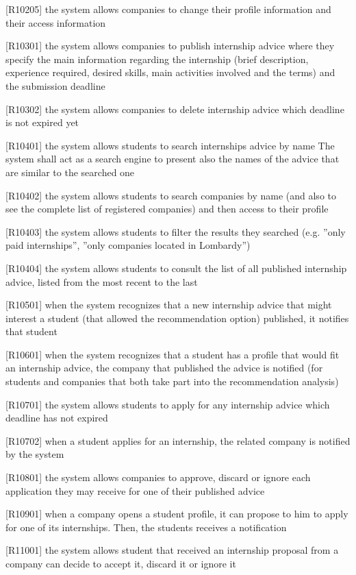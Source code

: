 		[R10205] the system allows companies to change their profile information and their access information
		
		[R10301] the system allows companies to publish internship advice where they specify the main information regarding the internship (brief description, experience required, desired skills, main activities involved and the terms) and the submission deadline
		
		[R10302] the system allows companies to delete internship advice which deadline is not expired yet
		
		[R10401] the system allows students to search internships advice by name The system shall act as a search engine to present also the names of the advice that are similar to the searched one
		
		[R10402] the system allows students to search companies by name (and also to see the complete list of registered companies) and then access to their profile
		
		[R10403] the system allows students to filter the results they searched (e.g. ”only paid internships”, ”only companies located in Lombardy”)
		
		[R10404] the system allows students to consult the list of all published internship advice, listed from the most recent to the last
		
		[R10501] when the system recognizes that a new internship advice that might interest a student (that allowed the recommendation option) published, it notifies that student
		
		[R10601] when the system recognizes that a student has a profile that would fit an internship advice, the company that published the advice is notified (for students and companies that both take part into the recommendation analysis)
		
		[R10701] the system allows students to apply for any internship advice which deadline has not expired
		
		[R10702] when a student applies for an internship, the related company is notified by the system
		
		[R10801] the system allows companies to approve, discard or ignore each application they may receive for one of their published advice
		
		[R10901] when a company opens a student profile, it can propose to him to apply for one of its internships. Then, the students receives a notification
		
		[R11001] the system allows student that received an internship proposal from a company can decide to accept it, discard it or ignore it
		
